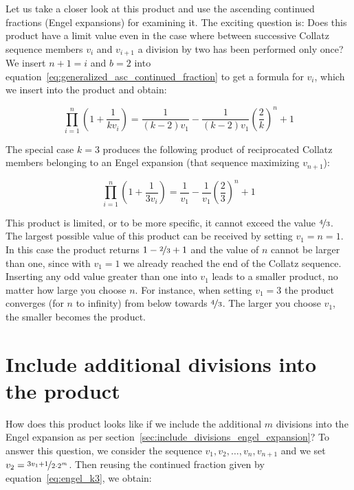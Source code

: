 \documentclass[12pt]{amsart}
\theoremstyle{definition}
\begin{document}
\par\medskip
Let us take a closer look at this product and use the ascending continued fractions (Engel expansions) for examining it. The exciting question is: Does this product have a limit value even in the case where between successive Collatz sequence members $v_i$ and $v_{i+1}$ a division by two has been performed only once? We insert $n+1=i$ and $b=2$ into equation~\ref{eq:generalized_asc_continued_fraction} to get a formula for $v_i$, which we insert into the product and obtain:

\begin{equation}
\label{eq:product_simplification_k}
\prod_{i=1}^{n}\left(1+\frac{1}{kv_{i}}\right)
=\frac{1}{(k-2)v_1}-\frac{1}{(k-2)v_1}\left(\frac{2}{k}\right)^n+1
\end{equation}

The special case $k=3$ produces the following product of reciprocated Collatz members belonging to an Engel expansion (that sequence maximizing $v_{n+1}$):

\begin{equation}
\label{eq:product_simplification_k3}
\prod_{i=1}^{n}\left(1+\frac{1}{3v_{i}}\right)
=\frac{1}{v_1}-\frac{1}{v_1}\left(\frac{2}{3}\right)^n+1
\end{equation}

This product is limited, or to be more specific, it cannot exceed the value $\nicefrac{4}{3}$. The largest possible value of this product can be received by setting $v_1=n=1$. In this case the product returns $1-\nicefrac{2}{3}+1$ and the value of $n$ cannot be larger than one, since with $v_1=1$ we already reached the end of the Collatz sequence. Inserting any odd value greater than one into $v_1$ leads to a smaller product, no matter how large you choose $n$. For instance, when setting $v_1=3$ the product converges (for $n$ to infinity) from below towards $\nicefrac{4}{3}$. The larger you choose $v_1$, the smaller becomes the product.

\section{Include additional divisions into the product}
How does this product looks like if we include the additional $m$ divisions into the Engel expansion as per section~\ref{sec:include_divisions_engel_expansion}? To answer this question, we consider the sequence $v_1,v_2,\ldots,v_n,v_{n+1}$ and we set $v_2=\nicefrac{3v_1+1}{2\cdot2^{m}}$. Then reusing the continued fraction given by equation~\ref{eq:engel_k3}, we obtain:
\end{document}
